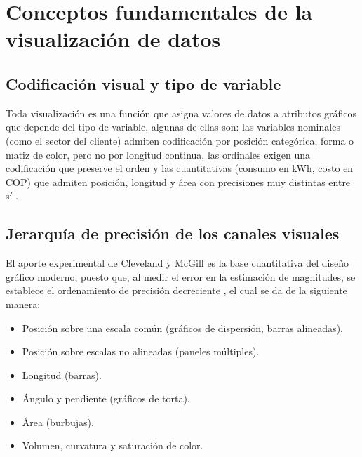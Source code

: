 \section{Conceptos fundamentales de la visualización de datos}
\label{fundamentals}
    \subsection{Codificación visual y tipo de variable}
    \label{visual_encoding}
        Toda visualización es una función que asigna valores de datos a atributos
        gráficos que depende del tipo de variable, algunas de ellas son: las variables
        nominales (como el sector del cliente) admiten codificación por posición
        categórica, forma o matiz de color, pero no por longitud continua, las ordinales
        exigen una codificación que preserve el orden y las cuantitativas (consumo en
        kWh, costo en COP) que admiten posición, longitud y área con precisiones muy
        distintas entre sí \cite{castro2026ciencia}.

    \subsection{Jerarquía de precisión de los canales visuales}
    \label{visual_channels}
        El aporte experimental de Cleveland y McGill es la base cuantitativa del diseño
        gráfico moderno, puesto que, al medir el error en la estimación de magnitudes,
        se establece el ordenamiento de precisión decreciente
        \cite{cleveland1984graphical}, el cual se da de la siguiente manera:

        \vspace{10pt}

        \begin{itemize}
            \item Posición sobre una escala común (gráficos de dispersión, barras
            alineadas).

            \item Posición sobre escalas no alineadas (paneles múltiples).

            \item Longitud (barras).

            \item Ángulo y pendiente (gráficos de torta).

            \item Área (burbujas).

            \item Volumen, curvatura y saturación de color.
        \end{itemize}

